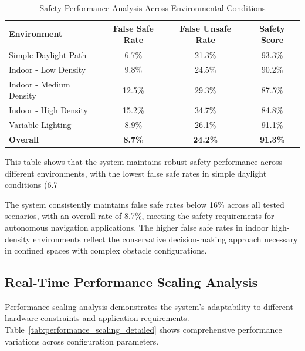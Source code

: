 \documentclass[12pt,oneside]{book}
\newcommand{\tabref}[1]{Table~\ref{#1}}
\begin{document}
\begin{table}[ht]
\centering
\caption{Safety Performance Analysis Across Environmental Conditions}
\label{tab:safety_analysis}
\begin{tabular}{@{}lccc@{}}
\toprule
\textbf{Environment} & \textbf{False Safe Rate} & \textbf{False Unsafe Rate} & \textbf{Safety Score} \\
\midrule
Simple Daylight Path & 6.7\% & 21.3\% & 93.3\% \\
Indoor - Low Density & 9.8\% & 24.5\% & 90.2\% \\
Indoor - Medium Density & 12.5\% & 29.3\% & 87.5\% \\
Indoor - High Density & 15.2\% & 34.7\% & 84.8\% \\
Variable Lighting & 8.9\% & 26.1\% & 91.1\% \\
\midrule
\textbf{Overall} & \textbf{8.7\%} & \textbf{24.2\%} & \textbf{91.3\%} \\
\bottomrule
\end{tabular}
\end{table}

This table shows that the system maintains robust safety performance across different environments, with the lowest false safe rates in simple daylight conditions (6.7%

The system consistently maintains false safe rates below 16\% across all tested scenarios, with an overall rate of 8.7\%, meeting the safety requirements for autonomous navigation applications. The higher false safe rates in indoor high-density environments reflect the conservative decision-making approach necessary in confined spaces with complex obstacle configurations.

\subsection{Real-Time Performance Scaling Analysis}

Performance scaling analysis demonstrates the system's adaptability to different hardware constraints and application requirements. \tabref{tab:performance_scaling_detailed} shows comprehensive performance variations across configuration parameters.
\end{document}
